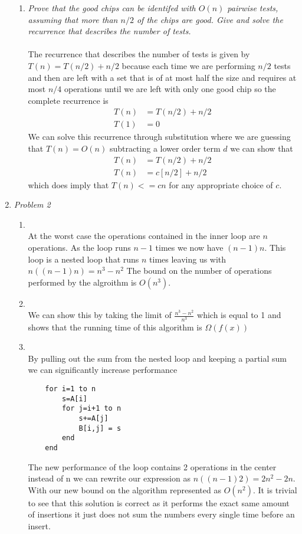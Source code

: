 \documentclass[12pt]{article}
\begin{document}
\begin{enumerate}
\begin{enumerate}
	\item \textit{Prove that the good chips can be identifed with $O(n)$ pairwise tests, assuming that more than $n/2$ of the chips are good. Give and solve the recurrence that describes the number of tests.}\\\\
	The recurrence that describes the number of tests is given by $T(n)=T(n/2)+n/2$ because each time we are performing $n/2$ tests and then are left with a set that is of at most half the size and requires at most $n/4$ operations until we are left with only one good chip so the complete recurrence is 
	\begin{align*}
	T(n) & = T(n/2)+n/2 \\
	T(1) & = 0 \enspace 
	\end{align*}
	We can solve this recurrence through substitution where we are guessing that $T(n)=O(n)$ subtracting a lower order term $d$ we can show that
	\begin{align*}
	T(n) & = T(n/2)+n/2 \\
	T(n) & = c[n/2]+n/2 \enspace
	\end{align*}
	which does imply that $T(n) <= cn$ for any appropriate choice of $c$.
	\end{enumerate}
	
	
	\item \textit{Problem 2}
	
	\begin{enumerate}
	\item \textit{}\\
	At the worst case the operations contained in the inner loop are $n$ operations. As the loop runs $n-1$ times we now have $(n-1)n$. This loop is a nested loop that runs $n$ times leaving us with $n((n-1)n) = n^3-n^2$ The bound on the number of operations performed by the algroithm is $O(n^3)$.

	\item \textit{}\\
	We can show this by taking the limit of $\frac{n^3-n^2}{n^3}$ which is equal to 1 and shows that the running time of this algorithm is $\Omega(f(x))$
\newpage
	\item \textit{}\\
	By pulling out the sum from the nested loop and keeping a partial sum we can significantly increase performance

	\begin{verbatim}
 	for i=1 to n
 		s=A[i]
 		for j=i+1 to n
 			s+=A[j]
 			B[i,j] = s
 		end
 	end
	\end{verbatim}
	The new performance of the loop contains 2 operations in the center instead of n we can rewrite our expression as $n((n-1)2) = 2n^2-2n$. With our new bound on the algorithm represented as $O(n^2)$. It is trivial to see that this solution is correct as it performs the exact same amount of insertions it just does not sum the numbers every single time before an insert.
	\end{enumerate}


\end{enumerate}
\end{document}
